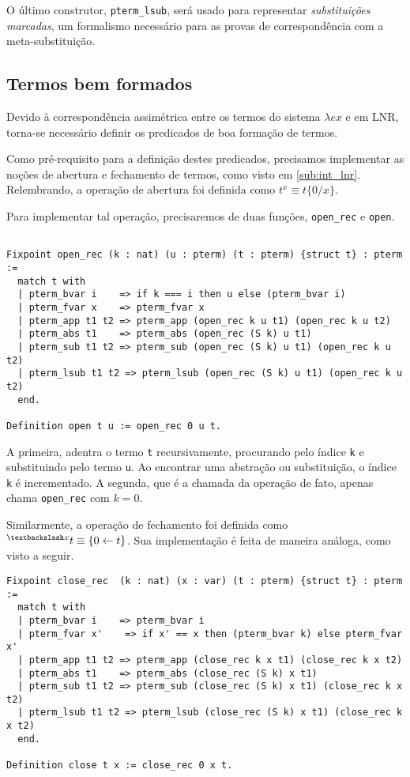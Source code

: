 O último construtor, \texttt{pterm\_lsub}, será usado para representar
\emph{substituições marcadas}, um formalismo necessário para as provas de
correspondência com a meta-substituição.

\subsection{Termos bem formados}

Devido à correspondência assimétrica entre os termos do sistema $\lambda ex$ e
em LNR, torna-se necessário definir os predicados de boa formação de termos.

Como pré-requisito para a definição destes predicados, precisamos implementar as
noções de abertura e fechamento de termos, como visto em \ref{sub:int_lnr}. 
Relembrando, a operação de abertura foi definida como $t^{x} \equiv t\{0/x\}$.

Para implementar tal operação, precisaremos de duas funções, \texttt{open\_rec}
e \texttt{open}.

\begin{lstlisting}[basicstyle=\small]
    
Fixpoint open_rec (k : nat) (u : pterm) (t : pterm) {struct t} : pterm :=
  match t with
  | pterm_bvar i    => if k === i then u else (pterm_bvar i)
  | pterm_fvar x    => pterm_fvar x
  | pterm_app t1 t2 => pterm_app (open_rec k u t1) (open_rec k u t2)
  | pterm_abs t1    => pterm_abs (open_rec (S k) u t1)
  | pterm_sub t1 t2 => pterm_sub (open_rec (S k) u t1) (open_rec k u t2)
  | pterm_lsub t1 t2 => pterm_lsub (open_rec (S k) u t1) (open_rec k u t2)
  end.

Definition open t u := open_rec 0 u t.
\end{lstlisting}

A primeira, adentra o termo \texttt{t} recursivamente, procurando pelo índice
\texttt{k} e substituindo pelo termo \texttt{u}. Ao encontrar uma abstração ou
substituição, o índice \texttt{k} é incrementado.  A segunda, que é a chamada da
operação de fato, apenas chama \texttt{open\_rec} com $k = 0$.

Similarmente, a operação de fechamento foi definida como $ ^{\textbackslash x}t
\equiv \{0 \leftarrow t\}$. Sua implementação é feita de maneira análoga, como
visto a seguir.
\pagebreak

\begin{lstlisting}[basicstyle=\small]
Fixpoint close_rec  (k : nat) (x : var) (t : pterm) {struct t} : pterm :=
  match t with
  | pterm_bvar i    => pterm_bvar i
  | pterm_fvar x'    => if x' == x then (pterm_bvar k) else pterm_fvar x'
  | pterm_app t1 t2 => pterm_app (close_rec k x t1) (close_rec k x t2)
  | pterm_abs t1    => pterm_abs (close_rec (S k) x t1)
  | pterm_sub t1 t2 => pterm_sub (close_rec (S k) x t1) (close_rec k x t2)
  | pterm_lsub t1 t2 => pterm_lsub (close_rec (S k) x t1) (close_rec k x t2)
  end.

Definition close t x := close_rec 0 x t.
    
\end{lstlisting}

